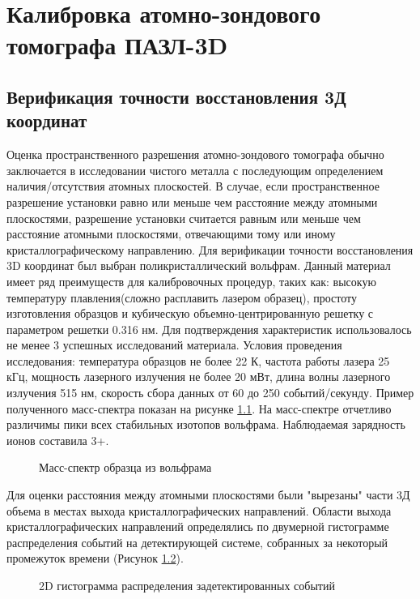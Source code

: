 \chapter{Калибровка атомно-зондового томографа ПАЗЛ-3D}\label{ch:ch3}

\section{Верификация точности восстановления 3Д координат}\label{sec:ch3/sect1}

Оценка пространственного разрешения атомно-зондового томографа обычно заключается в исследовании чистого металла с последующим определением наличия/отсутствия атомных плоскостей. В случае, если пространственное разрешение установки равно или меньше чем расстояние между атомными плоскостями, разрешение установки считается равным или меньше чем расстояние атомными плоскостями, отвечающими тому или иному кристаллографическому направлению. Для верификации точности восстановления 3D координат был выбран поликристаллический вольфрам\cite{scbibAPPLE}. Данный материал имеет ряд преимуществ для калибровочных процедур, таких как: высокую температуру плавления(сложно расплавить лазером образец), простоту изготовления образцов и кубическую объемно-центрированную решетку с параметром решетки 0.316 нм. Для подтверждения характеристик использовалось не менее 3 успешных исследований материала. Условия проведения исследования: температура образцов не более 22 К, частота работы лазера 25 кГц, мощность лазерного излучения не более 20 мВт, длина волны лазерного излучения 515 нм, скорость сбора данных от 60 до 250 событий/секунду. Пример полученного масс-спектра показан на рисунке \cref{fig:W_massspectr}. На масс-спектре отчетливо различимы пики всех стабильных изотопов вольфрама. Наблюдаемая зарядность ионов составила 3+. 

\begin{figure}[htb]
	\caption{Масс-спектр образца из вольфрама}
	\label{fig:W_massspectr}
\end{figure}

Для оценки расстояния между атомными плоскостями были "вырезаны" части 3Д объема в местах выхода кристаллографических направлений. Области выхода кристаллографических направлений определялись по двумерной гистограмме распределения событий на детектирующей системе, собранных за некоторый промежуток времени (Рисунок \cref{fig:W_3D}).

\begin{figure}[htb]
	\centerfloat{
		\texttt{[image: W\_3D]}
	}
	\caption{2D гистограмма распределения задетектированных событий}
	\label{fig:W_3D}
\end{figure}

